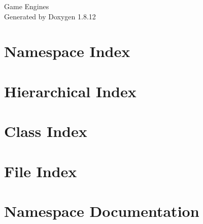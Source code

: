 \documentclass[twoside]{book}
\newcommand{\+}{\discretionary{\mbox{\scriptsize$\hookleftarrow$}}{}{}}
\newcommand{\clearemptydoublepage}{%
  \newpage{\pagestyle{empty}\cleardoublepage}%
}
\begin{document}
\hypersetup{pageanchor=false,
             bookmarksnumbered=true,
             pdfencoding=unicode
            }
\begin{titlepage}
\vspace*{7cm}
\begin{center}%
{\Large Game Engines }\\
\vspace*{1cm}
{\large Generated by Doxygen 1.8.12}\\
\end{center}
\end{titlepage}
\clearemptydoublepage
{}
\tableofcontents
\clearemptydoublepage
{}
\hypersetup{pageanchor=true}

\chapter{Namespace Index}

\chapter{Hierarchical Index}

\chapter{Class Index}

\chapter{File Index}

\chapter{Namespace Documentation}




\end{document}

